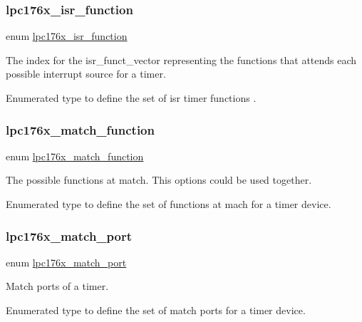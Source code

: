\subsubsection{\texorpdfstring{lpc176x\_isr\_function}{lpc176x\_isr\_function}}
{\footnotesize\ttfamily enum \mbox{\hyperlink{timer-defs_8h_ab4865a5da7fb70b3fbfa160ab5caf633}{lpc176x\+\_\+isr\+\_\+function}}}



The index for the isr\+\_\+funct\+\_\+vector representing the functions that attends each possible interrupt source for a timer. 

Enumerated type to define the set of isr timer functions . \mbox{\label{timer-defs_8h_a8e5f6514d6375d97fe49f7674968e244}} 
\subsubsection{\texorpdfstring{lpc176x\_match\_function}{lpc176x\_match\_function}}
{\footnotesize\ttfamily enum \mbox{\hyperlink{timer-defs_8h_a8e5f6514d6375d97fe49f7674968e244}{lpc176x\+\_\+match\+\_\+function}}}



The possible functions at match. This options could be used together. 

Enumerated type to define the set of functions at mach for a timer device. \mbox{\label{timer-defs_8h_a675d64238cc0f91f70dcb731e2f33d83}} 
\subsubsection{\texorpdfstring{lpc176x\_match\_port}{lpc176x\_match\_port}}
{\footnotesize\ttfamily enum \mbox{\hyperlink{timer-defs_8h_a675d64238cc0f91f70dcb731e2f33d83}{lpc176x\+\_\+match\+\_\+port}}}



Match ports of a timer. 

Enumerated type to define the set of match ports for a timer device. \mbox{\label{timer-defs_8h_ab87d5565db3afd3f1ad7b2762ab600b9}} 

